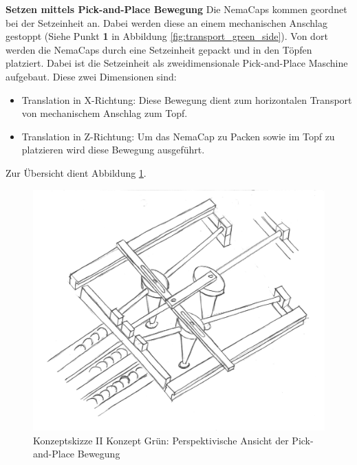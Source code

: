 \textbf{Setzen mittels Pick-and-Place Bewegung}
\newline
Die NemaCaps kommen geordnet bei der Setzeinheit an. Dabei werden diese an einem mechanischen Anschlag gestoppt (Siehe Punkt \textbf{1} in Abbildung \ref{fig:transport_green_side}). Von dort werden die NemaCaps durch eine Setzeinheit gepackt und in den Töpfen platziert. Dabei ist die Setzeinheit als zweidimensionale Pick-and-Place Maschine aufgebaut. Diese zwei Dimensionen sind:
\begin{itemize}
	\item Translation in X-Richtung: Diese Bewegung dient zum horizontalen Transport von mechanischem Anschlag zum Topf.
	\item Translation in Z-Richtung: Um das NemaCap zu Packen sowie im Topf zu platzieren wird diese Bewegung ausgeführt.
\end{itemize}
Zur Übersicht dient Abbildung \ref{fig:transport_green_pers}. 
\begin{figure}[H]
	\includegraphics[scale=0.6]{Illustrationen/5-Konzept/green_2Dmachine_pervsp.jpg}
	\caption{Konzeptskizze II Konzept Grün: Perspektivische Ansicht der Pick-and-Place Bewegung}
	\label{fig:transport_green_pers}
\end{figure}

